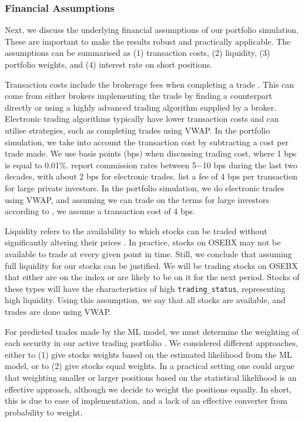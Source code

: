 \subsubsection{Financial Assumptions}
Next, we discuss the underlying financial assumptions of our portfolio simulation. These are important to make the results robust and practically applicable. The assumptions can be summarised as (1) transaction costs, (2) liquidity, (3) portfolio weights, and (4) interest rate on short positions.

Transaction costs include the brokerage fees when completing a trade \parencite{coase-transaction-costs}. This can come from either brokers implementing the trade by finding a counterpart directly or using a highly advanced trading algorithm supplied by a broker. Electronic trading algorithms typically have lower transaction costs and can utilise strategies, such as completing trades using VWAP. In the portfolio simulation, we take into account the transaction cost by subtracting a cost per trade made. We use basis points (bps) when discussing trading cost, where 1 bps is equal to 0.01\%. \textcite{nbim-investing-in-equities} report commission rates between 5$-$10 bps during the last two decades, with about 2 bps for electronic trades. \textcite{dnb-transaction-costs} list a fee of 4 bps per transaction for large private investors. In the portfolio simulation, we do electronic trades using VWAP, and assuming we can trade on the terms for large investors according to \textcite{dnb-transaction-costs}, we assume a transaction cost of 4 bps. 

Liquidity refers to the availability to which stocks can be traded without significantly altering their prices \parencite{hicks-liquidity}. In practice, stocks on OSEBX may not be available to trade at every given point in time. Still, we conclude that assuming full liquidity for our stocks can be justified. We will be trading stocks on OSEBX that either are on the index or are likely to be on it for the next period. Stocks of these types will have the characteristics of high \texttt{trading\_status}, representing high liquidity. Using this assumption, we say that all stocks are available, and trades are done using VWAP. 

For predicted trades made by the ML model, we must determine the weighting of each security in our active trading portfolio \parencite{frost-portfolio-weights}. We considered different approaches, either to (1) give stocks weights based on the estimated likelihood from the ML model, or to (2) give stocks equal weights. In a practical setting one could argue that weighting smaller or larger positions based on the statistical likelihood is an effective approach, although we decide to weight the positions equally. In short, this is due to ease of implementation, and a lack of an effective converter from probability to weight. 

